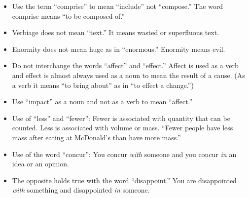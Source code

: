 \begin{itemize}
\item Use the term ``comprise'' to mean ``include'' not ``compose.'' The word comprise means ``to be composed of.''
\item Verbiage does not mean ``text.'' It means wasted or superfluous text.
\item Enormity does not mean huge as in ``enormous.'' Enormity means evil.
\item Do not interchange the words ``affect'' and ``effect.'' Affect is used as a verb and effect is almost always used as a noun to mean the result of a cause. (As a verb it means ``to bring about'' as in ``to effect a change.'') 
\item Use ``impact'' as a noun and not as a verb to mean ``affect.''
\item Use of ``less'' and ``fewer'': Fewer is associated with quantity that can be counted. Less is associated with volume or mass. ``Fewer people have less mass after eating at McDonald's than have more mass.''
\item Use of the word ``concur'': You concur \emph{with} someone and you concur \emph{in} an idea or an opinion. 
\item The opposite holds true with the word ``disappoint.'' You are disappointed \emph{with} something and disappointed \emph{in} someone.
\end{itemize}



